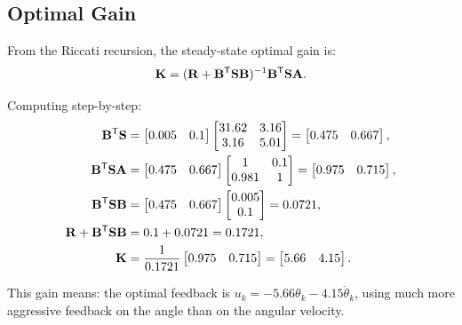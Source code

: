 \subsection{Optimal Gain}

From the Riccati recursion, the steady-state optimal gain is:
\begin{equation}
\mathbf{K} = (\mathbf{R} + \mathbf{B}^{\mathsf{T}}\mathbf{S}\mathbf{B})^{-1}\mathbf{B}^{\mathsf{T}}\mathbf{S}\mathbf{A}.
\label{eq:ch6:gain-computation}
\end{equation}

Computing step-by-step:
\begin{align}
\mathbf{B}^{\mathsf{T}}\mathbf{S} &= \begin{bmatrix} 0.005 & 0.1 \end{bmatrix} \begin{bmatrix} 31.62 & 3.16 \\ 3.16 & 5.01 \end{bmatrix}
                    = \begin{bmatrix} 0.475 & 0.667 \end{bmatrix}, \\
\mathbf{B}^{\mathsf{T}}\mathbf{S}\mathbf{A} &= \begin{bmatrix} 0.475 & 0.667 \end{bmatrix} \begin{bmatrix} 1 & 0.1 \\ 0.981 & 1 \end{bmatrix}
                          = \begin{bmatrix} 0.975 & 0.715 \end{bmatrix}, \\
\mathbf{B}^{\mathsf{T}}\mathbf{S}\mathbf{B} &= \begin{bmatrix} 0.475 & 0.667 \end{bmatrix} \begin{bmatrix} 0.005 \\ 0.1 \end{bmatrix}
                         = 0.0721, \\
\mathbf{R} + \mathbf{B}^{\mathsf{T}}\mathbf{S}\mathbf{B} &= 0.1 + 0.0721 = 0.1721, \\
\mathbf{K} &= \frac{1}{0.1721}\begin{bmatrix} 0.975 & 0.715 \end{bmatrix}
       = \begin{bmatrix} 5.66 & 4.15 \end{bmatrix}.
\label{eq:ch6:gain-values}
\end{align}

This gain means: the optimal feedback is $u_k = -5.66\theta_k - 4.15\dot\theta_k$, using much more aggressive
feedback on the angle than on the angular velocity.


